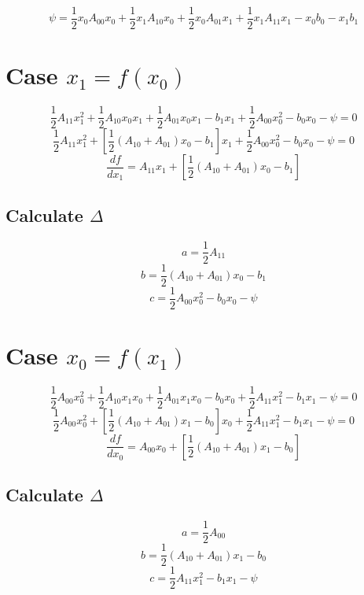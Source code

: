 \[\psi = \frac12 x_0 A_{00} x_0 + \frac12 x_1 A_{10} x_0 + \frac12 x_0 A_{01} x_1 + \frac12 x_1 A_{11} x_1 - x_0 b_0 - x_1 b_1\]

\section*{Case $x_1 = f(x_0)$}

\[\frac12 A_{11} x_1^2 + \frac12 A_{10} x_0 x_1 + \frac12 A_{01} x_0 x_1 - b_1 x_1 + \frac12 A_{00} x_0^2 - b_0 x_0 - \psi = 0\]
\[\frac12 A_{11} x_1^2 + \left[ \frac12 ( A_{10} + A_{01} ) x_0 - b_1 \right] x_1 + \frac12 A_{00} x_0^2 - b_0 x_0 - \psi = 0\]
\[\frac{df}{dx_1} = A_{11} x_1 + \left[ \frac12 ( A_{10} + A_{01} ) x_0 - b_1 \right]\]

\subsection*{Calculate $\Delta$}

\[a = \frac12 A_{11}\]
\[b = \frac12 ( A_{10} + A_{01} ) x_0 - b_1\]
\[c = \frac12 A_{00} x_0^2 - b_0 x_0 - \psi\]

\section*{Case $x_0 = f(x_1)$}

\[\frac12 A_{00} x_0^2 + \frac12 A_{10} x_1 x_0 + \frac12 A_{01} x_1 x_0 - b_0 x_0 + \frac12 A_{11} x_1^2 - b_1 x_1 - \psi = 0\]
\[\frac12 A_{00} x_0^2 + \left[ \frac12 ( A_{10} + A_{01} ) x_1 - b_0 \right] x_0 + \frac12 A_{11} x_1^2 - b_1 x_1 - \psi = 0\]
\[\frac{df}{dx_0} = A_{00} x_0 + \left[ \frac12 ( A_{10} + A_{01} ) x_1 - b_0 \right]\]

\subsection*{Calculate $\Delta$}

\[a = \frac12 A_{00}\]
\[b = \frac12 ( A_{10} + A_{01} ) x_1 - b_0\]
\[c = \frac12 A_{11} x_1^2 - b_1 x_1 - \psi\]


